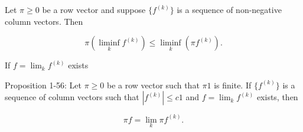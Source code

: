 Let $\pi \geq 0$ be a row vector and suppose $\{f^{(k)}\}$ is a sequence of non-negative column vectors. Then

$$\pi \left( \liminf_{k} f^{(k)} \right) \leq \liminf_{k} \left( \pi f^{(k)} \right).$$

If $f = \lim_{k} f^{(k)}$ exists

Proposition 1-56: Let $\pi \geq 0$ be a row vector such that $\pi 1$ is finite. If $\{f^{(k)}\}$ is a sequence of column vectors such that $|f^{(k)}| \leq c1$ and $f = \lim_k f^{(k)}$ exists, then

$$\pi f = \lim_k \pi f^{(k)}.$$
